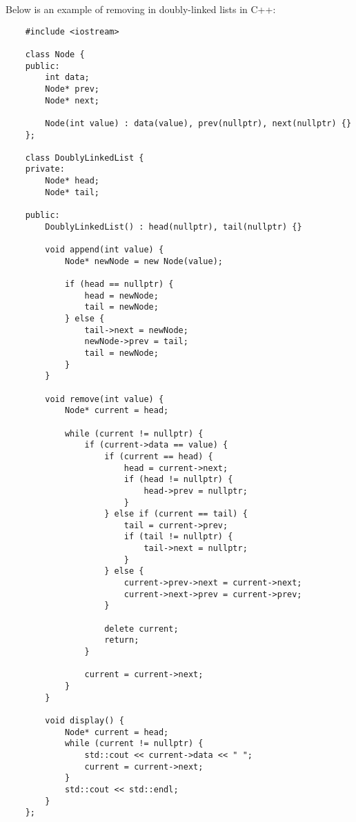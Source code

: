\begin{solution}
    Below is an example of removing in doubly-linked lists in C++:

    \horizontalline

    \begin{verbatim}
    #include <iostream>

    class Node {
    public:
        int data;
        Node* prev;
        Node* next;
    
        Node(int value) : data(value), prev(nullptr), next(nullptr) {}
    };
    
    class DoublyLinkedList {
    private:
        Node* head;
        Node* tail;
    
    public:
        DoublyLinkedList() : head(nullptr), tail(nullptr) {}
    
        void append(int value) {
            Node* newNode = new Node(value);
    
            if (head == nullptr) {
                head = newNode;
                tail = newNode;
            } else {
                tail->next = newNode;
                newNode->prev = tail;
                tail = newNode;
            }
        }
    
        void remove(int value) {
            Node* current = head;
    
            while (current != nullptr) {
                if (current->data == value) {
                    if (current == head) {
                        head = current->next;
                        if (head != nullptr) {
                            head->prev = nullptr;
                        }
                    } else if (current == tail) {
                        tail = current->prev;
                        if (tail != nullptr) {
                            tail->next = nullptr;
                        }
                    } else {
                        current->prev->next = current->next;
                        current->next->prev = current->prev;
                    }
    
                    delete current;
                    return;
                }
    
                current = current->next;
            }
        }
    
        void display() {
            Node* current = head;
            while (current != nullptr) {
                std::cout << current->data << " ";
                current = current->next;
            }
            std::cout << std::endl;
        }
    };
    

\end{verbatim}
\end{solution}
